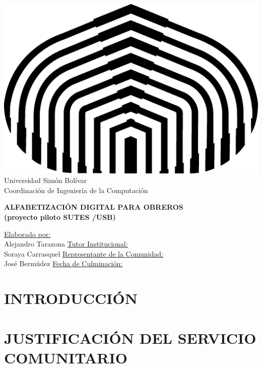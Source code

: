 \documentclass[letterpaper,12pt]{article}
\begin{document}
	
	\begin{center}
		\includegraphics{./img/logo.png} \\
		Universidad Simón Bolívar \\
		Coordinación de Ingeniería de la Computación
        
		\vfill
		{\LARGE \textbf{ALFABETIZACIÓN DIGITAL PARA OBREROS \\ (proyecto piloto SUTES /USB)} }
		\vfill
        
        
		\underline{Elaborado por:}\\
		Alejandro Tarazona
        \linebreak
        \linebreak
		\underline{Tutor Institucional:}\\
		Soraya Carrasquel
        \linebreak
        \linebreak
		\underline{Representante de la Comunidad:}\\
		José Bermúdez
		\linebreak
        \linebreak
        \linebreak
		\underline{Fecha de Culminación:}\\
		
	\end{center}
	\pagebreak
    
	\tableofcontents
	\pagebreak
	
	\section{INTRODUCCIÓN}
	\pagebreak
	
	\section{JUSTIFICACIÓN DEL SERVICIO\\ COMUNITARIO}
    
\end{document}
